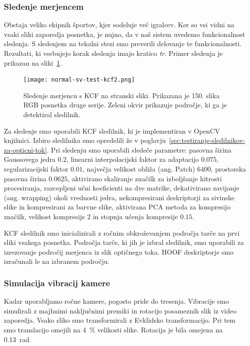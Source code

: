 \subsubsection{Sledenje merjencem}\label{sec:tracking}
Obstaja veliko ekipnih športov, kjer sodeluje več igralcev. Ker so vsi vidni na vsaki sliki zaporedja posnetka, je nujno, da v naš sistem uvedemo funkcionalnost sledenja. S sledenjem na tekalni stezi smo preverili delovanje te funkcionalnosti. Rezultati, ki vsebujejo korak sledenja imajo kratico \textit{tr}. Primer sledenja je prikazan na sliki~\ref{fig:sledenje}.

\begin{figure}[!htb]
	\centering
	\texttt{[image: normal-sv-test-kcf2.png]}
	\caption[Sledenje merjencu s KCF na stranski sliki]{Sledenje merjencu s KCF na stranski sliki. Prikazana je 150. slika RGB posnetka druge serije. Zeleni okvir prikazuje področje, ki ga je detektiral sledilnik.}
	\label{fig:sledenje}
\end{figure} 

Za sledenje smo uporabili KCF sledilnik, ki je implementiran v OpenCV knjižnici. Izbiro sledilnika smo opredelili že v poglavju~\ref{sec:testiranje-sledilnikov-za-opticni-tok}. Pri sledenju smo uporabili sledeče parametre: pasovna širina Gaussovega jedra $0.2$, linearni interpolacijski faktor za adaptacijo $0.075$, regularizacijski faktor $0.01$, največja velikost obliža (ang. Patch) $6400$, prostorska pasovna širina $0.0625$, aktivirano skaliranje značilk za izboljšanje hitrosti procesiranja, razcepljeni učni koeficienti na dve matrike, dekativirano zavijanje (ang. wrapping) okoli vrednosti jedra, nekompresirani deskriptorji za sivinske slike in kompresirani za barvne slike, aktivirana PCA metoda za kompresijo značilk, velikost kompresije $2$ in  stopnja učenja kompresije $0.15$.

KCF sledilnik smo inicializirali z ročnim obkroževanjem področja tarče na prvi sliki vsakega posnetka. Področja tarče, ki jih je izbral sledilnik, smo uporabili za izrezovanje področij merjenca iz slik optičnega toka. HOOF deskriptorje smo izračunali le na izbranem področju. 



\subsubsection{Simulacija vibracij kamere}
Kadar uporabljamo ročne kamere, pogosto pride do tresenja. Vibracije smo simulirali z majhnimi naključnimi premiki in rotacijo posameznih slik iz video zaporedja. Vsako sliko smo transformirali z Evklidsko transformacijo. Pri tem smo translacijo omejili na \SI{4}{\%} velikosti slike. Rotacija je bila omejena na \SI{0.13}{rad}. 

